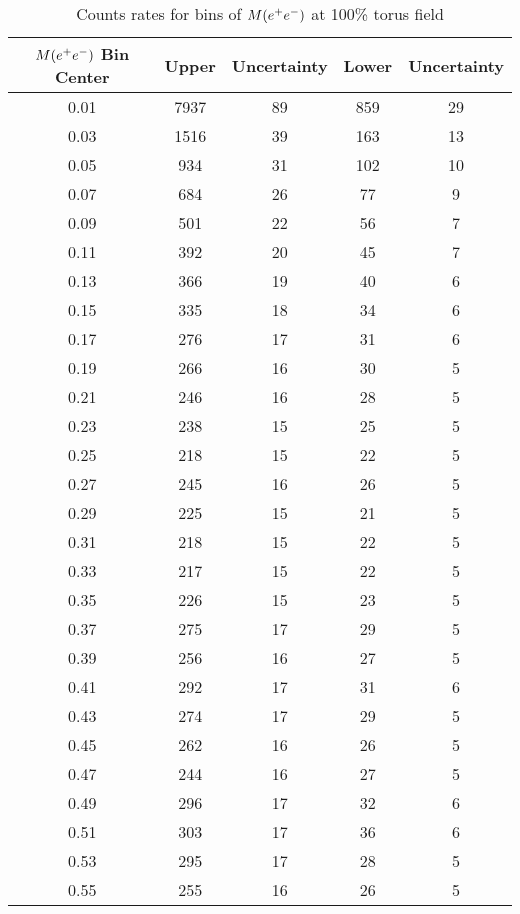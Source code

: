 \begin{table}[h!]
\begin{minipage}{\textwidth}
\begin{center}

\caption[Expected count rates]{\label{tab:countsfull}Counts rates for bins of $M(e^+e^-)$ at 100\% torus field\vspace{0.75mm}}

\begin{tabular}{c|c|c|c|c}

\hline
$M(e^+e^-)$ Bin Center & Upper  & Uncertainty & Lower & Uncertainty \\
\hline
0.01  & 7937  & 89  & 859  & 29\\
0.03  & 1516  & 39  & 163  & 13\\
0.05  & 934  & 31  & 102  & 10\\
0.07  & 684  & 26  & 77  & 9\\
0.09  & 501  & 22  & 56  & 7\\
0.11  & 392  & 20  & 45  & 7\\
0.13  & 366  & 19  & 40  & 6\\
0.15  & 335  & 18  & 34  & 6\\
0.17  & 276  & 17  & 31  & 6\\
0.19  & 266  & 16  & 30  & 5\\
0.21  & 246  & 16  & 28  & 5\\
0.23  & 238  & 15  & 25  & 5\\
0.25  & 218  & 15  & 22  & 5\\
0.27  & 245  & 16  & 26  & 5\\
0.29  & 225  & 15  & 21  & 5\\
0.31  & 218  & 15  & 22  & 5\\
0.33  & 217  & 15  & 22  & 5\\
0.35  & 226  & 15  & 23  & 5\\
0.37  & 275  & 17  & 29  & 5\\
0.39  & 256  & 16  & 27  & 5\\
0.41  & 292  & 17  & 31  & 6\\
0.43  & 274  & 17  & 29  & 5\\
0.45  & 262  & 16  & 26  & 5\\
0.47  & 244  & 16  & 27  & 5\\
0.49  & 296  & 17  & 32  & 6\\
0.51  & 303  & 17  & 36  & 6\\
0.53  & 295  & 17  & 28  & 5\\
0.55  & 255  & 16  & 26  & 5\\

\end{tabular}
\end{center}
\end{minipage}
\end{table}
